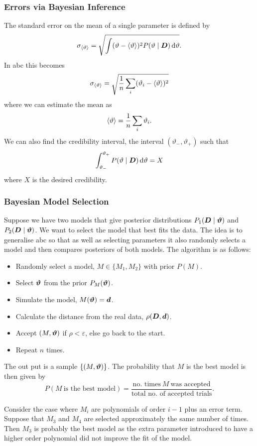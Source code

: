 \documentclass[a4paper]{article}
\newcommand{\st}{\mid}
\begin{document}
    \subsubsection{Errors via Bayesian Inference}
    The standard error on the mean of a single parameter is defined by
    \[\sigma_{\expected{\vartheta}} = \sqrt{\int(\vartheta - \expected{\vartheta})^2 P(\vartheta\st\vv{D})\dd{\vartheta}}.\]
    In \gls{abc} this becomes
    \[\sigma_{\langle{\vartheta}\rangle} = \sqrt{\frac{1}{n}\sum_i(\vartheta_i - \langle{\vartheta}\rangle)^2}\]
    where we can estimate the mean as
    \[\langle{\vartheta}\rangle = \frac{1}{n}\sum_i \vartheta_i.\]
    We can also find the credibility interval, the interval \((\vartheta_-, \vartheta_+)\) such that
    \[\int_{\vartheta_-}^{\vartheta_+} P(\vartheta\st\vv{D})\dd{\vartheta} = X\]
    where \(X\) is the desired credibility.
    
    \subsubsection{Bayesian Model Selection}
    Suppose we have two models that give posterior distributions \(P_1(\vv{D}\st\vv{\vartheta})\) and \(P_2(\vv{D}\st\vv{\vartheta})\).
    We want to select the model that best fits the data.
    The idea is to generalise \gls{abc} so that as well as selecting parameters it also randomly selects a model and then compares posteriors of both models.
    The algorithm is as follows:
    \begin{itemize}
        \item Randomly select a model, \(M \in \{M_1, M_2\}\) with prior \(P(M)\).
        \item Select \(\bm{\vartheta}\) from the prior \(P_{M}(\bm{\vartheta})\).
        \item Simulate the model, \(M(\bm{\vartheta}) = \bm{d}\).
        \item Calculate the distance from the real data, \(\rho(\bm{D}, \bm{d})\).
        \item Accept \((M, \bm{\vartheta})\) if \(\rho < \varepsilon\), else go back to the start.
        \item Repeat \(n\) times.
    \end{itemize}
    The out put is a sample \(\{(M, \bm{\vartheta})\}\).
    The probability that \(M\) is the best model is then given by
    \[P(M~\text{is the best model}) = \frac{\text{no. times}~M~\text{was accepted}}{\text{total no. of accepted trials}}.\]
    
    Consider the case where \(M_i\) are polynomials of order \(i - 1\) plus an error term.
    Suppose that \(M_3\) and \(M_4\) are selected approximately the same number of times.
    Then \(M_3\) is probably the best model as the extra parameter introduced to have a higher order polynomial did not improve the fit of the model.
    
\end{document}
